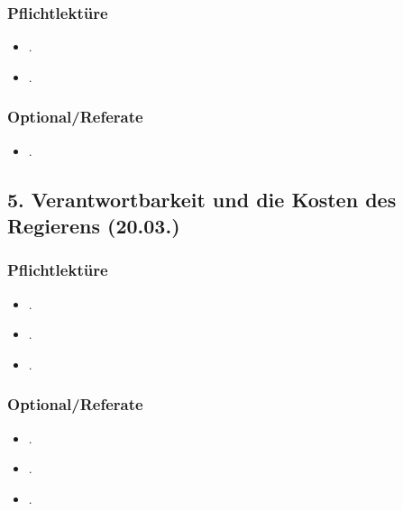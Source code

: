 \documentclass[abstract=on,parskip=full,headings=standardclasses,fontsize=11pt,paper=a4]{scrartcl}
\begin{document}
\subsubsection*{Pflichtlektüre}
\begin{itemize}
\item {}.
\item {}.
\end{itemize}


\subsubsection*{Optional/Referate}
\begin{itemize}
\item {}.
\end{itemize}


%




\subsection{5. Verantwortbarkeit und die Kosten des Regierens (20.03.)}

\subsubsection*{Pflichtlektüre}
\begin{itemize}
\item {}.
\item {}.
\item {}.
\end{itemize}


\subsubsection*{Optional/Referate}
\begin{itemize}
\item {}.
\item {}.
\item {}.
\end{itemize}
\end{document}
